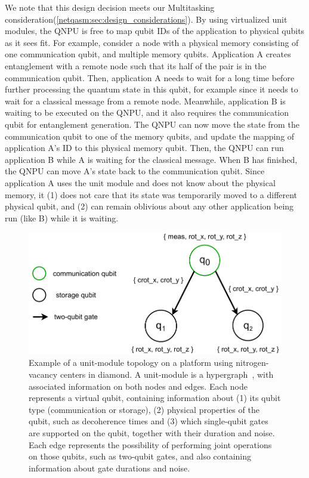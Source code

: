 We note that this design decision meets our Multitasking consideration(\cref{netqasm:sec:design_considerations}).
By using virtualized unit modules, the \ac{QNPU} is free to map qubit IDs of the application to physical qubits as it sees fit.
For example, consider a node with a physical memory consisting of one communication qubit, and multiple memory qubits.
Application A creates entanglement with a remote node such that its half of the pair is in the communication qubit.
Then, application A needs to wait for a long time before further processing the quantum state in this qubit, for example since it needs to wait for a classical message from a remote node.
Meanwhile, application B is waiting to be executed on the \ac{QNPU}, and it also requires the communication qubit for entanglement generation.
The \ac{QNPU} can now move the state from the communication qubit to one of the memory qubits, and update the mapping of application A's ID to this physical memory qubit.
Then, the \ac{QNPU} can run application B while A is waiting for the classical message.
When B has finished, the \ac{QNPU} can move A's state back to the communication qubit.
Since application A uses the unit module and does not know about the physical memory, it
    (1) does not care that its state was temporarily moved to a different physical qubit, and
    (2) can remain oblivious about any other application being run (like B) while it is waiting.


\begin{figure}[t]
      \centering
      \includegraphics[width=0.6\linewidth]{figures/netqasm/unit-module.pdf}
      \caption{Example of a unit-module topology on a platform using
            nitrogen-vacancy centers in diamond. A unit-module is a
            hypergraph~\cite{berge1984hypergraphs}, with associated information
            on both nodes and edges. Each node represents a virtual qubit,
            containing information about (1) its qubit type (communication or
            storage), (2) physical properties of the qubit, such as decoherence
            times and (3) which single-qubit gates are supported on the qubit,
            together with their duration and noise. Each edge represents the
            possibility of performing joint operations on those qubits, such as
            two-qubit gates, and also containing information about gate
            durations and noise.}
      \label{fig:topology}
\end{figure}



